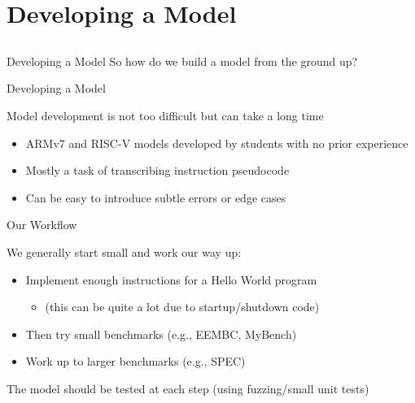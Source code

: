 \section{Developing a Model}
\subsection{}

\begin{frame}{Developing a Model}
So how do we build a model from the ground up?
\end{frame}

\begin{frame}{Developing a Model}

Model development is not too difficult but can take a long time

\begin{itemize}
\item ARMv7 and RISC-V models developed by students with no prior experience
\item Mostly a task of transcribing instruction pseudocode
\item Can be easy to introduce subtle errors or edge cases
\end{itemize}

\end{frame}

\begin{frame}{Our Workflow}

We generally start small and work our way up:
\begin{itemize}
\item Implement enough instructions for a Hello World program
\begin{itemize}
\item (this can be quite a lot due to startup/shutdown code)
\end{itemize}
\item Then try small benchmarks (e.g., EEMBC, MyBench)
\item Work up to larger benchmarks (e.g., SPEC)
\end{itemize}

The model should be tested at each step (using fuzzing/small unit tests)

\end{frame}

